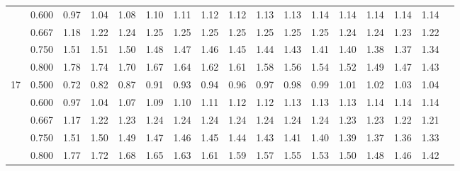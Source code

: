 {\begin{center}
\begin{tabular}{rrr@{\,}r@{\,}r@{\,}r@{\,}r@{\,}r@{\,}r@{\,}r
                   @{\,}r@{\,}r@{\,}r@{\,}r@{\,}r@{\,}r@{\,}r}
  &0.600&0.97&1.04&1.08&1.10&1.11&1.12&1.12&1.13&1.13&1.14&1.14&1.14&1.14&1.14\\
  &0.667&1.18&1.22&1.24&1.25&1.25&1.25&1.25&1.25&1.25&1.25&1.24&1.24&1.23&1.22\\
  &0.750&1.51&1.51&1.50&1.48&1.47&1.46&1.45&1.44&1.43&1.41&1.40&1.38&1.37&1.34\\
  &0.800&1.78&1.74&1.70&1.67&1.64&1.62&1.61&1.58&1.56&1.54&1.52&1.49&1.47&1.43\\
17&0.500&0.72&0.82&0.87&0.91&0.93&0.94&0.96&0.97&0.98&0.99&1.01&1.02&1.03&1.04\\
  &0.600&0.97&1.04&1.07&1.09&1.10&1.11&1.12&1.12&1.13&1.13&1.13&1.14&1.14&1.14\\
  &0.667&1.17&1.22&1.23&1.24&1.24&1.24&1.24&1.24&1.24&1.24&1.23&1.23&1.22&1.21\\
  &0.750&1.51&1.50&1.49&1.47&1.46&1.45&1.44&1.43&1.41&1.40&1.39&1.37&1.36&1.33\\
  &0.800&1.77&1.72&1.68&1.65&1.63&1.61&1.59&1.57&1.55&1.53&1.50&1.48&1.46&1.42
\end{tabular}
\end{center}

\newpage

\thispagestyle{empty}

}
